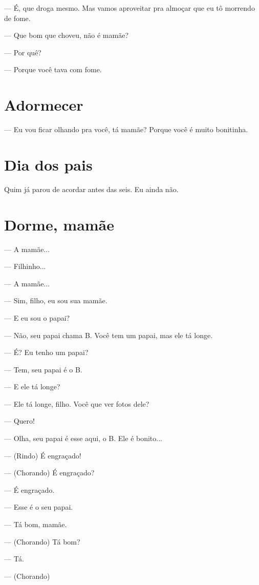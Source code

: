 --- É, que droga mesmo. Mas vamos aproveitar pra almoçar que eu tô
morrendo de fome.

--- Que bom que choveu, não é mamãe?

--- Por quê?

--- Porque você tava com fome.

\chapter{Adormecer}\label{adormecer}

--- Eu vou ficar olhando pra você, tá mamãe? Porque você é muito
bonitinha.

\chapter{Dia dos pais}\label{dia-dos-pais}

{Quim já parou de acordar antes das seis. Eu ainda
não.}

\chapter{Dorme, mamãe}\label{dorme-mamuxe3e}

--- A mamãe...

--- Filhinho...

--- A mamãe...

--- Sim, filho, eu sou sua mamãe.

--- E eu sou o papai?

--- Não, seu papai chama B. Você tem um papai, mas ele tá longe.

--- É? Eu tenho um papai?

--- Tem, seu papai é o B.

--- E ele tá longe?

--- Ele tá longe, filho. Você que ver fotos dele?

--- Quero!

--- Olha, seu papai é esse aqui, o B. Ele é bonito...

--- (Rindo) É engraçado!

--- (Chorando) É engraçado?

--- É engraçado.

--- Esse é o seu papai.

--- Tá bom, mamãe.

--- (Chorando) Tá bom?

--- Tá.

--- (Chorando)

